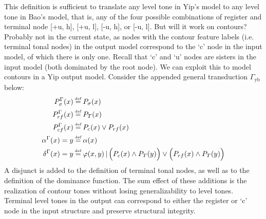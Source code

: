\documentclass{article}
\newcommand\myeq{\mathrel{\stackrel{\makebox[0pt]{\mbox{\normalfont\tiny def}}}{=}}}
\begin{document}
This definition is sufficient to translate any level tone in Yip's model to any level tone in Bao's model, that is, any of the four possible combinations of register and terminal node [+u, h], [+u, l], [-u, h], or [-u, l]. But will it work on contours? Probably not in the current state, as nodes with the contour feature labels (i.e. terminal tonal nodes) in the output model correspond to the `c' node in the input model, of which there is only one. Recall that `c' and `u' nodes are sisters in the input model (both dominated by the root node). We can exploit this to model contours in a Yip output model. Consider the appended general transduction $\Gamma_{\text{yb}}$ below:
\begin{equation}
\begin{split}
P^{\Gamma}_{\sigma}(x) &\myeq P_{\sigma}(x) \\
P^{\Gamma}_{rf}(x) &\myeq P_{T}(x) \\
P^{\Gamma}_{cf}(x) &\myeq P_{c}(x) \lor P_{rf}(x) \\
\alpha^{\Gamma}(x)=y &\myeq \alpha(x)\\
\delta^{\Gamma}(x)=y &\myeq \varphi(x,y)\,|\,\Big(P_{c}(x)\land P_{T}(y)\Big)\lor\Big(P_{rf}(x)\land P_{T}(y)\Big)
\end{split}
\end{equation}
A disjunct is added to the definition of terminal tonal nodes, as well as to the definition of the dominance function. The sum effect of these additions is the realization of contour tones without losing generalizability to level tones. Terminal level tones in the output can correspond to either the register or `c' node in the input structure and preserve structural integrity.
\end{document}
